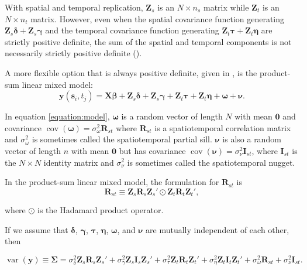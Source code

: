 \documentclass[]{interact}
\theoremstyle{plain}%
\theoremstyle{definition}
\theoremstyle{remark}
\begin{document}
With spatial and temporal replication, \(\mathbf{Z}_s\) is an
\(N \times n_s\) matrix while \(\mathbf{Z}_t\) is an \(N \times n_t\)
matrix. However, even when the spatial covariance function generating
\(\mathbf{Z}_{s} \bm{\delta} + \mathbf{Z}_{s} \bm{\gamma}\) and the
temporal covariance function generating
\(\mathbf{Z}_{t} \bm{\tau} + \mathbf{Z}_{t} \bm{\eta}\) are strictly
positive definite, the sum of the spatial and temporal components is not
necessarily strictly positive definite (\citet{myers1990variograms}).

A more flexible option that is always positive definite, given in
\citet{dumelle2021linear}, is the product-sum linear mixed model:
\mbox{} \begin{equation} \label{equation:model}
\mathbf{y}(\mathbf{s}_{i}, t_j) = \mathbf{X} \bm{\beta} + \mathbf{Z}_{s} \bm{\delta} + \mathbf{Z}_{s} \bm{\gamma} + \mathbf{Z}_t \bm{\tau} + \mathbf{Z}_t \bm{\eta} + \bm{\omega} + \bm{\nu}.
\end{equation}

\noindent In equation \ref{equation:model}, \(\bm{\omega}\) is a random
vector of length \(N\) with mean \(\mathbf{0}\) and covariance
\(\mathop{\mathrm{{cov}}}(\bm{\omega}) = \sigma^2_{\omega} \mathbf{R}_{st}\)
where \(\mathbf{R}_{st}\) is a spatiotemporal correlation matrix and
\(\sigma^2_{\omega}\) is sometimes called the spatiotemporal partial
sill. \(\bm{\nu}\) is also a random vector of length \(n\) with mean
\(\mathbf{0}\) but has covariance
\(\mathop{\mathrm{{cov}}}(\bm{\nu}) = \sigma^2_{\nu} \mathbf{I}_{st}\),
where \(\mathbf{I}_{st}\) is the \(N \times N\) identity matrix and
\(\sigma^2_{\nu}\) is sometimes called the spatiotemporal nugget.

In the product-sum linear mixed model, the formulation for
\(\mathbf{R}_{st}\) is \mbox{} \begin{equation*}
\mathbf{R}_{st} \equiv \mathbf{Z}_{s} \mathbf{R}_{s} \mathbf{Z}_{s}' \odot \mathbf{Z}_t \mathbf{R}_t \mathbf{Z}_t',
\end{equation*}

\noindent where \(\odot\) is the Hadamard product operator.

If we assume that \(\bm{\delta}\), \(\bm{\gamma}\), \(\bm{\tau}\),
\(\bm{\eta}\), \(\bm{\omega}\), and \(\bm{\nu}\) are mutually
independent of each other, then

\begin{equation}
\label{equation:var}
\mathop{\mathrm{{var}}}(\mathbf{y}) \equiv \bm{\Sigma} = \sigma^2_{\delta} \mathbf{Z}_{s} \mathbf{R}_{s} \mathbf{Z}_{s}' + \sigma^2_{\gamma} \mathbf{Z}_{s} \mathbf{I}_{s} \mathbf{Z}_{s}' + \sigma^2_{\tau} \mathbf{Z}_t \mathbf{R}_t \mathbf{Z}_t'+ \sigma^2_{\eta} \mathbf{Z}_t \mathbf{I}_t \mathbf{Z}_t' + \sigma^2_{\omega} \mathbf{R}_{st} + \sigma^2_{\nu} \mathbf{I}_{st}.
\end{equation}
\end{document}
